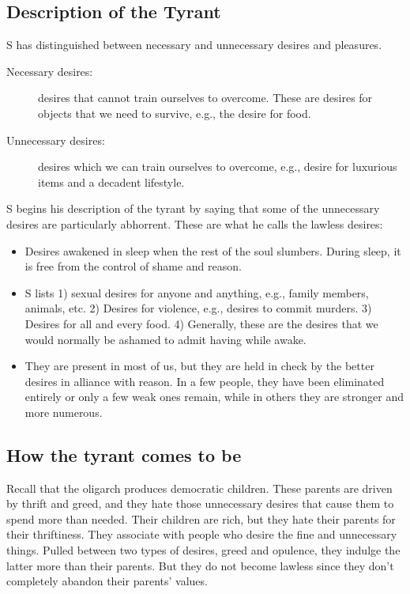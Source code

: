 \documentclass[oneside]{article}
\begin{document}
\subsection*{Description of the Tyrant}\label{description-of-the-tyrant}

S has distinguished between necessary and unnecessary desires and
pleasures.

\begin{description}
\item[Necessary desires:]
desires that cannot train ourselves to overcome. These are desires for
objects that we need to survive, e.g., the desire for food.
\item[Unnecessary desires:]
desires which we can train ourselves to overcome, e.g., desire for
luxurious items and a decadent lifestyle.
\end{description}
S begins his description of the tyrant by saying that some of the
unnecessary desires are particularly abhorrent. These are what he calls
the lawless desires:

\begin{itemize}
\item
  Desires awakened in sleep when the rest of the soul slumbers. During sleep, it is free  from the control of shame and reason.
\item
  S lists 1) sexual desires for anyone and anything, e.g., family
  members, animals, etc. 2) Desires for violence, e.g., desires to
  commit murders. 3) Desires for all and every food. 4) Generally, these are the  desires that we would normally be ashamed to admit having while awake.
\item
  They are present in most of us, but they are held in check by
  the better desires in alliance with reason. In a few people, they have
  been eliminated entirely or only a few weak ones remain, while in
  others they are stronger and more numerous.
\end{itemize}

\subsection*{How the tyrant comes to be}

Recall that the oligarch produces democratic children. These parents are driven by thrift and greed, and they hate those unnecessary desires that cause them to spend more than needed. Their children are rich, but they hate their parents for their thriftiness. They associate with people who desire the fine and unnecessary things. Pulled between two types of desires, greed and opulence, they indulge the latter more than their parents. But they do not become lawless since they don't completely abandon their parents' values. \\
\end{document}
